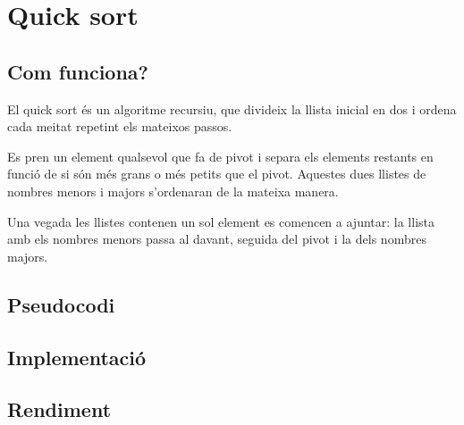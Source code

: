 \chapter{Quick sort}

\section{Com funciona?}
El quick sort és un algoritme recursiu, que divideix la llista inicial en dos i ordena cada meitat repetint els mateixos passos.

Es pren un element qualsevol que fa de pivot i separa els elements restants en funció de si són més grans o més petits que el pivot. Aquestes dues llistes de nombres menors i majors s'ordenaran de la mateixa manera.

Una vegada les llistes contenen un sol element es comencen a ajuntar: la llista amb els nombres menors passa al davant, seguida del pivot i la dels nombres majors.
\section{Pseudocodi}

\section{Implementació}


\section{Rendiment}
\noindent
\makebox[\textwidth][c]{
	
}
\vspace*{1em}
